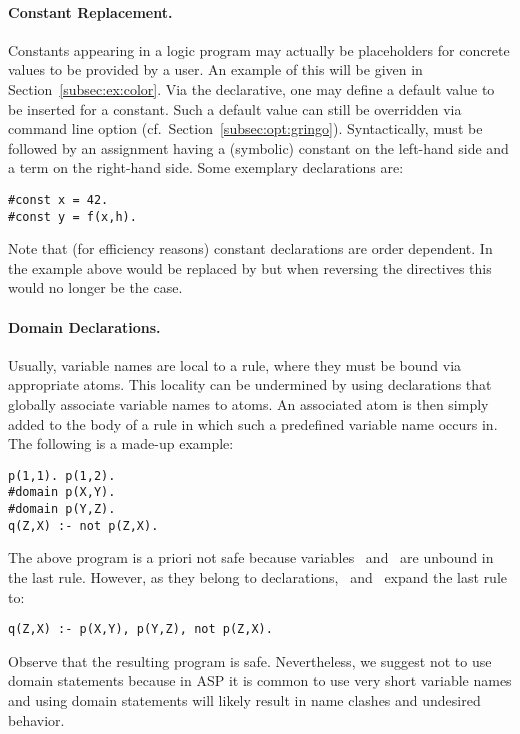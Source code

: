\paragraph{Constant Replacement.}
Constants appearing in a logic program may actually be placeholders for
concrete values to be provided by a user.
An example of this will be given in Section~\ref{subsec:ex:color}.
Via the  declarative,
one may define a default value to be inserted for a constant.
Such a default value can still be overridden via command line option
 (cf.\ Section~\ref{subsec:opt:gringo}).
Syntactically,  must be followed by an assignment having
a (symbolic) constant on the left-hand side and a term on the right-hand side.
Some exemplary  declarations are:
%
\begin{lstlisting}[numbers=none]
#const x = 42.
#const y = f(x,h).
\end{lstlisting}%
Note that (for efficiency reasons) constant declarations are order dependent.
In the example above  would be replaced by 
but when reversing the directives this would no longer be the case.

\paragraph{Domain Declarations.}
Usually, variable names are local to a rule,
where they must be bound via appropriate atoms.
This locality can be undermined by using
 declarations 
that globally associate variable names to atoms.
An associated atom is then simply added to the body of a rule in which
such a predefined variable name occurs in.
The following is a made-up example:
%
\begin{lstlisting}[numbers=none]
p(1,1). p(1,2).
#domain p(X,Y).
#domain p(Y,Z).
q(Z,X) :- not p(Z,X).
\end{lstlisting}
%
The above program is a priori not safe because
variables~ and~ are unbound in the last rule.
However, as they belong to  declarations,
\gringo\ and \clingo\ expand the last rule to:
%
\begin{lstlisting}[numbers=none]
q(Z,X) :- p(X,Y), p(Y,Z), not p(Z,X).
\end{lstlisting}
%
Observe that the resulting program is safe.
Nevertheless, we suggest not to use domain statements because 
in ASP it is common to use very short variable names and
using domain statements will likely result in name clashes
and undesired behavior.

